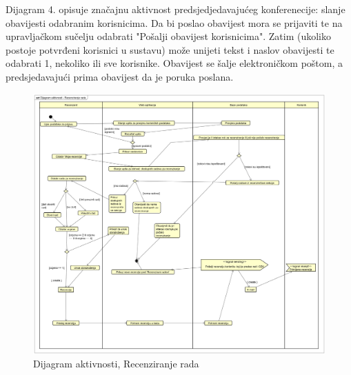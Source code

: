 			 Dijagram 4. opisuje značajnu aktivnost predsjedjedavajućeg konferenecije: slanje obavijesti odabranim korisnicima. Da bi poslao obavijest mora se prijaviti te na upravljačkom sučelju odabrati "Pošalji obavijest korisnicima". Zatim (ukoliko postoje potvrđeni korisnici u sustavu) može unijeti tekst i naslov obavijesti te odabrati 1, nekoliko ili sve korisnike. Obavijest se šalje elektroničkom poštom, a predsjedavajući prima obavijest da je poruka poslana.
			 
			 \begin{figure}[H]
			 	\includegraphics[width = 15cm, keepaspectratio]{dijagrami/Dijagram aktivnosti - Recenziranje rada.png} 
			 	\centering
			 	\caption{Dijagram aktivnosti, Recenziranje rada}
			 	\label{fig:act1}
			 \end{figure}

